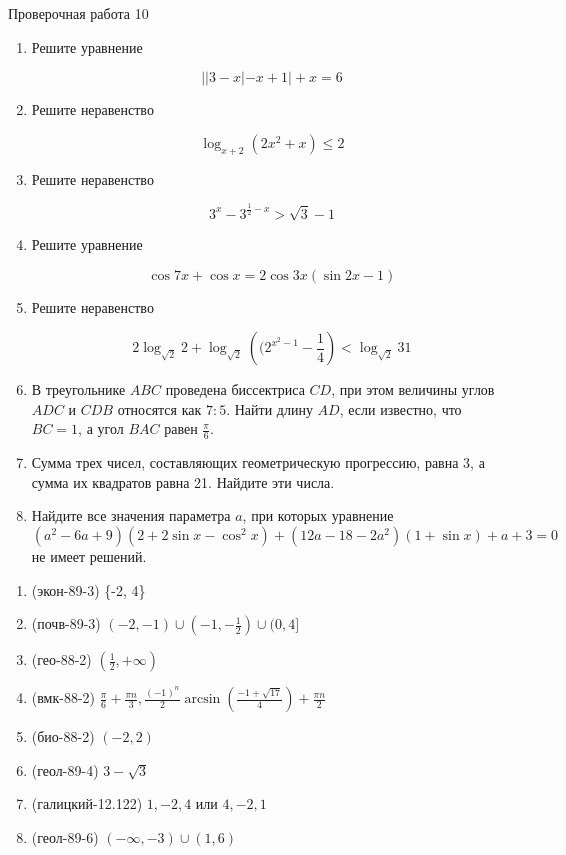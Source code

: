 \documentclass[11pt,a5paper]{report}
\begin{document}
\newpage

\begin{center}
Проверочная работа 10


\end{center}

\begin{enumerate}

\item Решите уравнение

$$||3-x|-x+1|+x=6$$

\item Решите неравенство

$$\log_{x+2}(2x^2+x)\leqslant 2$$

\item Решите неравенство

$$3^x-3^{\frac{1}{2}-x} > \sqrt{3}-1$$

\item Решите уравнение

$$\cos 7x+\cos x = 2\cos 3x (\sin 2x -1)$$

\item Решите неравенство

$$2\log_{\sqrt{2}}2+\log_{\sqrt{2}}\left((2^{x^2-1}-\frac{1}{4}\right) < \log_{\sqrt{2}}31$$

\item В треугольнике $ABC$ проведена биссектриса $CD$, при этом величины углов $ADC$ и $CDB$ относятся как $7:5$. Найти длину $AD$, если известно, что $BC=1$, а угол $BAC$ равен $\frac{\pi}{6}$.

\item Сумма трех чисел, составляющих геометрическую прогрессию, равна 3, а сумма их квадратов равна 21. Найдите эти числа.

\item Найдите все значения параметра $a$, при которых уравнение
$$(a^2-6a+9)(2+2\sin x - \cos^2 x)+(12a-18-2a^2)(1+\sin x)+a+3=0$$
не имеет решений.
\end{enumerate}

\newpage

\begin{enumerate}

\item (экон-89-3) \{-2, 4\}

\item (почв-89-3) $(-2, -1)\cup(-1,-\frac{1}{2})\cup(0, 4]$

\item (гео-88-2) $(\frac{1}{2}, +\infty)$

\item (вмк-88-2) $\frac{\pi}{6}+\frac{\pi n}{3}, \frac{(-1)^n}{2}\arcsin\left(\frac{-1+\sqrt{17}}{4}\right)+\frac{\pi n}{2}$

\item (био-88-2) $(-2, 2)$

\item (геол-89-4) $3-\sqrt{3}$

\item (галицкий-12.122) $1, -2, 4$ или $4, -2, 1$

\item (геол-89-6) $(-\infty, -3)\cup(1, 6)$

\end{enumerate}
\end{document}
